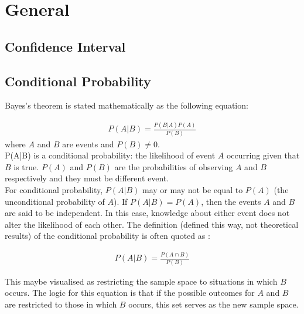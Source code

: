 \graphicspath{%
{chapter5graph/}%
{chapter5graph/bg/}}


\chapter{General}



\section{Confidence Interval}

\section{Conditional Probability}

Bayes's theorem is stated mathematically as the following equation:

\begin{eqnarray}
P(A|B) = \frac{P(B|A)P(A)}{P(B)}
\end{eqnarray}
where $A$ and $B$ are events and $P(B) \neq 0$.\\

P(A|B) is a conditional probability: the likelihood of event $A$ occurring given that $B$ is true. $P(A)$ and $P(B)$ are the probabilities of observing $A$ and $B$ respectively and they must be different event.\\

For conditional probability, $P(A|B)$ may or may not be equal to $P(A)$ (the unconditional probability of $A$). If $P(A|B) = P(A)$, then the events $A$ and $B$ are said to be independent. In this case, knowledge about either event does not alter the likelihood of each other. The definition (defined this way, not theoretical results) of the conditional probability is often quoted as :

\begin{eqnarray}
P(A|B) = \frac{P(A \cap B)}{P(B)}
\end{eqnarray}

This maybe visualised as restricting the sample space to situations in which $B$ occurs. The logic for this equation is that if the possible outcomes for $A$ and $B$ are restricted to those in which $B$ occurs, this set serves as the new sample space.

